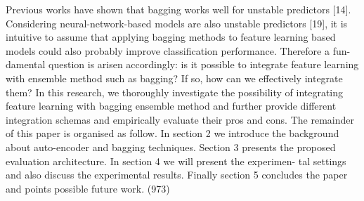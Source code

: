 Previous works have shown that bagging works well for unstable predictors
[14]. Considering neural-network-based models are also unstable predictors [19],
it is intuitive to assume that applying bagging methods to feature learning based
models could also probably improve classification performance. Therefore a fun-
damental question is arisen accordingly: is it possible to integrate feature learning
with ensemble method such as bagging? If so, how can we effectively integrate
them? In this research, we thoroughly investigate the possibility of integrating
feature learning with bagging ensemble method and further provide different
integration schemas and empirically evaluate their pros and cons.
The remainder of this paper is organised as follow. In section 2 we introduce
the background about auto-encoder and bagging techniques. Section 3 presents
the proposed evaluation architecture. In section 4 we will present the experimen-
tal settings and also discuss the experimental results. Finally section 5 concludes
the paper and points possible future work. (973)
